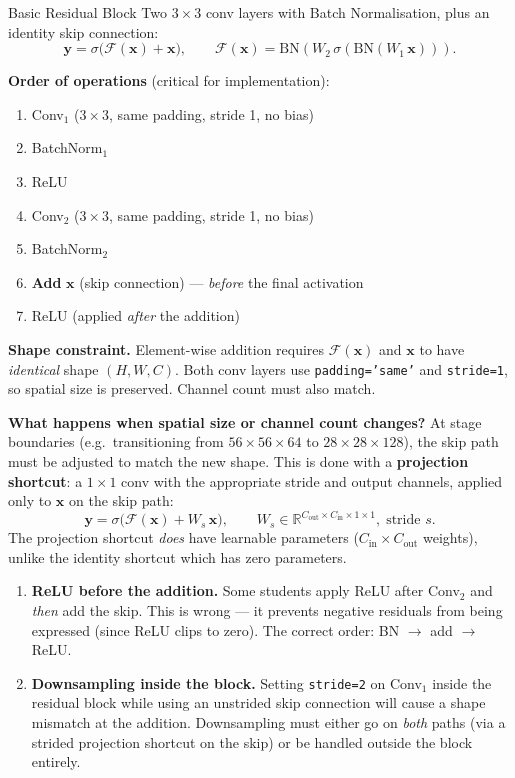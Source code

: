 \documentclass[11pt,a4paper]{article}
\newcommand{\term}[1]{\textcolor{DefGreen}{\textbf{#1}}\index{#1}}
\begin{document}
\begin{defbox}{Basic Residual Block}
Two $3\times3$ conv layers with Batch Normalisation, plus an identity skip connection:
\[
  \mathbf{y} = \sigma\!\bigl(\mathcal{F}(\mathbf{x}) + \mathbf{x}\bigr),
  \qquad
  \mathcal{F}(\mathbf{x}) = \mathrm{BN}(W_2\,\sigma(\mathrm{BN}(W_1\,\mathbf{x}))).
\]

\textbf{Order of operations} (critical for implementation):
\begin{enumerate}
  \item Conv$_1$ ($3\times3$, same padding, stride 1, no bias)
  \item BatchNorm$_1$
  \item ReLU
  \item Conv$_2$ ($3\times3$, same padding, stride 1, no bias)
  \item BatchNorm$_2$
  \item \textbf{Add} $\mathbf{x}$ (skip connection) — \emph{before} the final activation
  \item ReLU (applied \emph{after} the addition)
\end{enumerate}

\textbf{Shape constraint.}  Element-wise addition requires $\mathcal{F}(\mathbf{x})$ and
$\mathbf{x}$ to have \emph{identical} shape $(H, W, C)$.  Both conv layers use
\texttt{padding='same'} and \texttt{stride=1}, so spatial size is preserved.  Channel count
must also match.
\end{defbox}

\textbf{What happens when spatial size or channel count changes?}
At stage boundaries (e.g.\ transitioning from $56\times56\times64$ to $28\times28\times128$),
the skip path must be adjusted to match the new shape.  This is done with a
\term{projection shortcut}: a $1\times1$ conv with the appropriate stride and output channels,
applied only to $\mathbf{x}$ on the skip path:
\[
  \mathbf{y} = \sigma\!\bigl(\mathcal{F}(\mathbf{x}) + W_s\,\mathbf{x}\bigr),
  \qquad W_s \in \mathbb{R}^{C_\text{out} \times C_\text{in} \times 1 \times 1},\;\text{stride }s.
\]
The projection shortcut \emph{does} have learnable parameters ($C_\text{in} \times C_\text{out}$
weights), unlike the identity shortcut which has zero parameters.

\begin{warnbox}
\begin{enumerate}
  \item \textbf{ReLU before the addition.}  Some students apply ReLU after Conv$_2$ and
    \emph{then} add the skip.  This is wrong — it prevents negative residuals from being
    expressed (since ReLU clips to zero).  The correct order: BN $\to$ add $\to$ ReLU.
  \item \textbf{Downsampling inside the block.}  Setting \texttt{stride=2} on Conv$_1$
    inside the residual block while using an unstrided skip connection will cause a shape
    mismatch at the addition.  Downsampling must either go on \emph{both} paths
    (via a strided projection shortcut on the skip) or be handled outside the block entirely.
\end{enumerate}
\end{warnbox}
\end{document}
